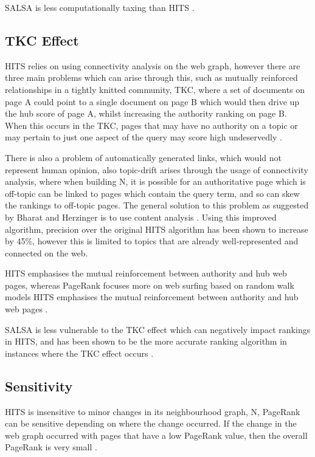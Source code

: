 \documentclass[11pt]{report}
\begin{document}
{SALSA is less computationally taxing than HITS \cite{lempel2000stochastic}. 
\subsection{TKC Effect}

HITS relies on using connectivity analysis on the web graph, however there are three main problems which can arise through this, such as mutually reinforced relationships in a tightly knitted community, TKC, where a set of documents on page A could point to a single document on page B which would then drive up the hub score of page A, whilst increasing the authority ranking on page B. When this occurs in the TKC, pages that may have no authority on a topic or may pertain to just one aspect of the query may score high undeservedly \cite{lempel2000stochastic}. 

There is also a problem of automatically generated links, which would not represent human opinion, also topic-drift arises through the usage of connectivity analysis, where when building N, it is possible for an authoritative page which is off-topic can be linked to pages which contain the query term, and so can skew the rankings to off-topic pages. The general solution to this problem as suggested by Bharat and Herzinger is to use content analysis \cite{bharat1998improved}. Using this improved algorithm, precision over the original HITS algorithm has been shown to increase by 45\%, however this is limited to topics that are already well-represented and connected on the web. 

HITS emphasises the mutual reinforcement between authority and hub web pages, whereas PageRank focuses more on web surfing based on random walk models HITS emphasises the mutual reinforcement between authority and hub web pages \cite{ding2003pagerank}.

SALSA is less vulnerable to the TKC effect which can negatively impact rankings in HITS, and has been shown to be the more accurate ranking algorithm in instances where the TKC effect occurs \cite{lempel2000stochastic}.

\subsection{Sensitivity}

HITS is insensitive to minor changes in its neighbourhood graph, N, PageRank can be sensitive depending on where the change occurred. If the change in the web graph occurred with pages that have a low PageRank value, then the overall PageRank is very small \cite{ng2001stable}.

}
\end{document}
